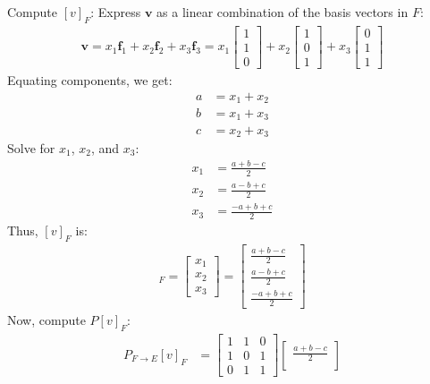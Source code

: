 \begin{enumerate}
\begin{enumerate}[label={(\alph*)}]
Compute $[v]_F$: Express $\mathbf{v}$ as a linear combination of the basis vectors in $F$:
\begin{align}
    \mathbf{v} = x_1 \mathbf{f}_1 + x_2 \mathbf{f}_2 + x_3 \mathbf{f}_3 = x_1 \begin{bmatrix} 1 \\ 1 \\ 0 \end{bmatrix} + x_2 \begin{bmatrix} 1 \\ 0 \\ 1 \end{bmatrix} + x_3 \begin{bmatrix} 0 \\ 1 \\ 1 \end{bmatrix}
\end{align}
Equating components, we get:
\begin{align*}
    a &= x_1 + x_2 \\
    b &= x_1 + x_3 \\
    c &= x_2 + x_3
\end{align*}
Solve for $x_1$, $x_2$, and $x_3$:
\begin{align*}
    x_1 &= \frac{a + b - c}{2} \\
    x_2 &= \frac{a - b + c}{2} \\
    x_3 &= \frac{-a + b + c}{2}
\end{align*}
Thus, $[v]_F$ is:
\begin{align*}
    [v]_F = \begin{bmatrix}
    x_1 \\
    x_2 \\
    x_3
    \end{bmatrix} = \begin{bmatrix}
    \displaystyle\frac{a + b - c}{2} \\[10pt]
    \displaystyle\frac{a - b + c}{2} \\[10pt]
    \displaystyle\frac{-a + b + c}{2}
    \end{bmatrix}
\end{align*}
Now, compute $P[v]_F$:
\begin{align}
    P_{F\to E}[v]_F &= \begin{bmatrix}
    1&1&0\\
       1&0&1\\
       0&1&1
    \end{bmatrix} \begin{bmatrix}
    \displaystyle\frac{a + b - c}{2} \\[10pt]

\end{bmatrix}
\end{align}
\end{enumerate}
\end{enumerate}
